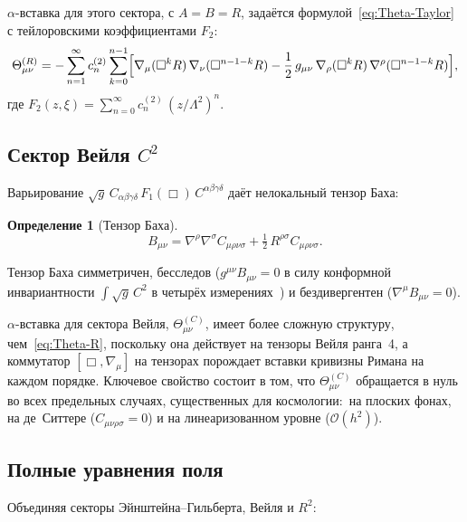 \documentclass[12pt,a4paper]{article}
\newcommand{\order}{\mathcal{O}}
\newcommand{\Lam}{\Lambda}
\theoremstyle{plain}
\theoremstyle{definition}
\newtheorem{definition}[theorem]{Определение}
\begin{document}
$\alpha$-вставка для этого сектора, с $A = B = R$, задаётся
формулой~\eqref{eq:Theta-Taylor} с тейлоровскими коэффициентами $F_2$:
\begin{equation}\label{eq:Theta-R}
  \Theta^{(R)}_{\mu\nu} = -\sum_{n=1}^{\infty} c_n^{(2)}
  \sum_{k=0}^{n-1}
  \Bigl[\nabla_\mu(\Box^k R)\,\nabla_\nu(\Box^{n-1-k} R)
  - \frac{1}{2}\,g_{\mu\nu}\,\nabla_\rho(\Box^k R)\,
  \nabla^\rho(\Box^{n-1-k} R)\Bigr],
\end{equation}
где $F_2(z,\xi) = \sum_{n=0}^{\infty} c_n^{(2)}\,(z/\Lam^2)^n$.

\subsection{Сектор Вейля \texorpdfstring{$C^2$}{C2}}

Варьирование $\sqrt{g}\,C_{\alpha\beta\gamma\delta}\,
F_1(\Box)\,C^{\alpha\beta\gamma\delta}$ даёт нелокальный тензор Баха:

\begin{definition}[Тензор Баха]
\label{def:bach}
\begin{equation}\label{eq:bach}
  B_{\mu\nu} = \nabla^\rho\nabla^\sigma C_{\mu\rho\nu\sigma}
  + \tfrac{1}{2}\,R^{\rho\sigma}C_{\mu\rho\nu\sigma}.
\end{equation}
\end{definition}

\noindent
Тензор Баха симметричен, бесследов ($g^{\mu\nu}B_{\mu\nu} = 0$ в силу
конформной инвариантности $\int\sqrt{g}\,C^2$ в четырёх
измерениях~\cite{Stelle:1978}) и бездивергентен
($\nabla^\mu B_{\mu\nu} = 0$).

$\alpha$-вставка для сектора Вейля, $\Theta^{(C)}_{\mu\nu}$, имеет более
сложную структуру, чем~\eqref{eq:Theta-R}, поскольку она действует на
тензоры Вейля ранга~4, а коммутатор $[\Box, \nabla_\mu]$ на тензорах
порождает вставки кривизны Римана на каждом порядке.  Ключевое свойство
состоит в том, что $\Theta^{(C)}_{\mu\nu}$ обращается в нуль во всех
предельных случаях, существенных для космологии:\ на плоских фонах, на
де~Ситтере ($C_{\mu\nu\rho\sigma} = 0$) и на линеаризованном уровне
($\order(h^2)$).

\subsection{Полные уравнения поля}

Объединяя секторы Эйнштейна--Гильберта, Вейля и $R^2$:
\end{document}
